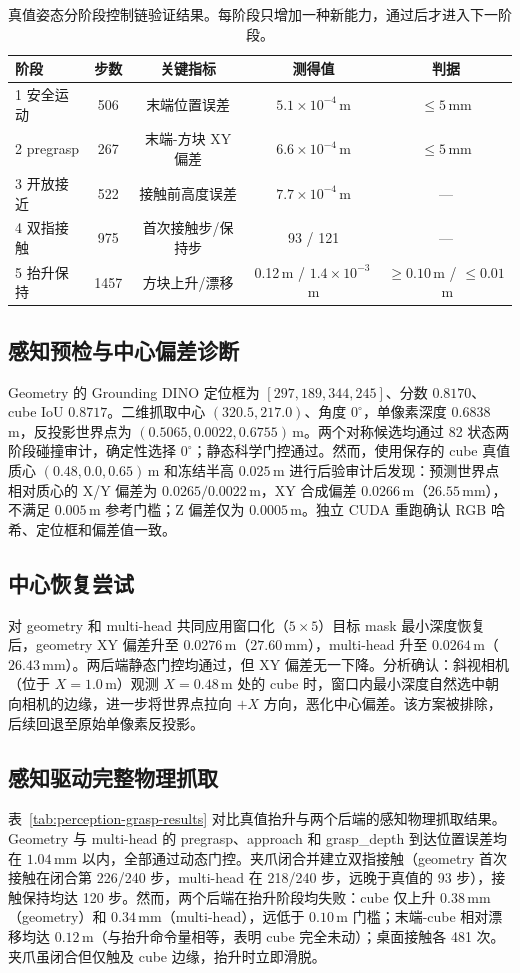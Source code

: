 \documentclass{l4proj}
\begin{document}
\begin{table}[htbp]
  \centering
  \caption{真值姿态分阶段控制链验证结果。每阶段只增加一种新能力，通过后才进入下一阶段。}
  \label{tab:truth-control-chain}
  \begin{tabular}{lcccc}
    \toprule
    阶段 & 步数 & 关键指标 & 测得值 & 判据 \\
    \midrule
    1 安全运动 & 506 & 末端位置误差 & $5.1\times10^{-4}$\,m & $\leq5$\,mm \\
    2 pregrasp & 267 & 末端-方块 XY 偏差 & $6.6\times10^{-4}$\,m & $\leq5$\,mm \\
    3 开放接近 & 522 & 接触前高度误差 & $7.7\times10^{-4}$\,m & --- \\
    4 双指接触 & 975 & 首次接触步/保持步 & 93 / 121 & --- \\
    5 抬升保持 & 1457 & 方块上升/漂移 & 0.12\,m / $1.4\times10^{-3}$\,m & $\geq0.10$\,m / $\leq0.01$\,m \\
    \bottomrule
  \end{tabular}
\end{table}

\subsection{感知预检与中心偏差诊断}
Geometry 的 Grounding DINO 定位框为 $[297,189,344,245]$、分数 $0.8170$、cube IoU $0.8717$。二维抓取中心 $(320.5,217.0)$、角度 $0^\circ$，单像素深度 $0.6838$\,m，反投影世界点为 $(0.5065,0.0022,0.6755)$\,m。两个对称候选均通过 82 状态两阶段碰撞审计，确定性选择 $0^\circ$；静态科学门控通过。然而，使用保存的 cube 真值质心 $(0.48,0.0,0.65)$\,m 和冻结半高 $0.025$\,m 进行后验审计后发现：预测世界点相对质心的 X/Y 偏差为 $0.0265/0.0022$\,m，XY 合成偏差 $0.0266$\,m（$26.55$\,mm），不满足 $0.005$\,m 参考门槛；Z 偏差仅为 $0.0005$\,m。独立 CUDA 重跑确认 RGB 哈希、定位框和偏差值一致。

\subsection{中心恢复尝试}
对 geometry 和 multi-head 共同应用窗口化（$5\times5$）目标 mask 最小深度恢复后，geometry XY 偏差升至 $0.0276$\,m（$27.60$\,mm），multi-head 升至 $0.0264$\,m（$26.43$\,mm）。两后端静态门控均通过，但 XY 偏差无一下降。分析确认：斜视相机（位于 $X=1.0$\,m）观测 $X=0.48$\,m 处的 cube 时，窗口内最小深度自然选中朝向相机的边缘，进一步将世界点拉向 $+X$ 方向，恶化中心偏差。该方案被排除，后续回退至原始单像素反投影。

\subsection{感知驱动完整物理抓取}
表~\ref{tab:perception-grasp-results} 对比真值抬升与两个后端的感知物理抓取结果。Geometry 与 multi-head 的 pregrasp、approach 和 grasp\_depth 到达位置误差均在 $1.04$\,mm 以内，全部通过动态门控。夹爪闭合并建立双指接触（geometry 首次接触在闭合第 226/240 步，multi-head 在 218/240 步，远晚于真值的 93 步），接触保持均达 120 步。然而，两个后端在抬升阶段均失败：cube 仅上升 $0.38$\,mm（geometry）和 $0.34$\,mm（multi-head），远低于 $0.10$\,m 门槛；末端-cube 相对漂移均达 $0.12$\,m（与抬升命令量相等，表明 cube 完全未动）；桌面接触各 481 次。夹爪虽闭合但仅触及 cube 边缘，抬升时立即滑脱。
\end{document}
